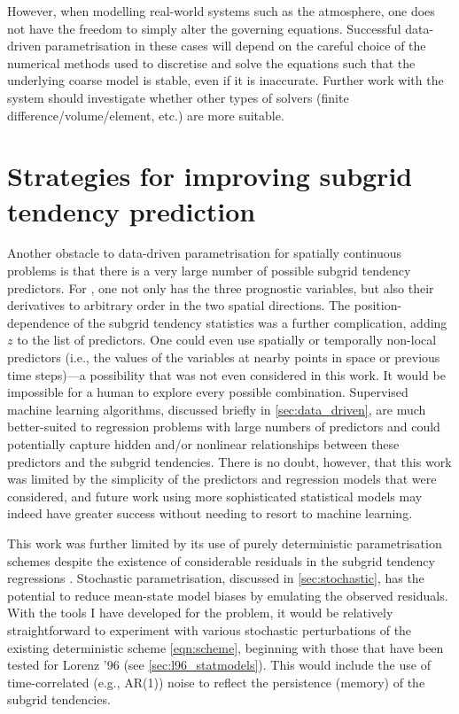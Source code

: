 \documentclass[../main.tex]{subfiles}
\begin{document}
However, when modelling real-world systems such as the atmosphere, one does
not have the freedom to simply alter the governing equations. Successful
data-driven parametrisation in these cases will depend on the careful choice of
the numerical methods used to discretise and solve the equations such that
the underlying coarse model is stable, even if it is inaccurate. Further work
with the \rb{} system should investigate whether other types of solvers
(finite difference/volume/element, etc.) are more suitable.


\section{Strategies for improving subgrid tendency prediction}
\label{sec:improve_prediction}
Another obstacle to data-driven parametrisation for spatially continuous
problems is that there is a very large number of possible subgrid tendency
predictors. For \rb{}, one not only has the three prognostic variables, but
also their derivatives to arbitrary order in the two spatial directions. The
position-dependence of the subgrid tendency statistics was a further
complication, adding $z$ to the list of predictors. One could even use
spatially or temporally non-local predictors (i.e., the values of the variables
at nearby points in space or previous time steps)---a possibility that was not
even considered in this work. It would be impossible for a human to explore
every possible combination. Supervised machine learning algorithms, discussed
briefly in \cref{sec:data_driven}, are much better-suited to regression
problems with large numbers of predictors and could potentially capture hidden
and/or nonlinear relationships between these predictors and the subgrid
tendencies. There is no doubt, however, that this work was limited by the
simplicity of the predictors and regression models that were considered, and
future work using more sophisticated statistical models may indeed have greater
success without needing to resort to machine learning.

This work was further limited by its use of purely deterministic
parametrisation schemes despite the existence of considerable residuals
in the subgrid tendency regressions
. Stochastic parametrisation, discussed in
\cref{sec:stochastic}, has the potential to reduce mean-state model
biases by emulating the observed residuals. With the tools I have developed for
the \rb{} problem, it would be relatively straightforward to experiment with
various stochastic perturbations of the existing deterministic scheme
\cref{eqn:scheme}, beginning with those that have been tested for
Lorenz '96 (see \cref{sec:l96_statmodels}). This would include the use
of time-correlated (e.g., AR(1)) noise to reflect the persistence (memory)
of the subgrid tendencies.
\end{document}
